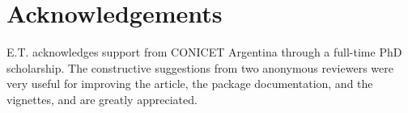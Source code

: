 \section{Acknowledgements}

E.T. acknowledges support from CONICET Argentina through a full-time PhD scholarship. The constructive suggestions from two
anonymous reviewers were very useful for improving the article, the package documentation, and the vignettes, and are greatly
appreciated. 




\address{Ezequiel Toum\\
  IANIGLA-CONICET\\
  Av. Ruiz Leal s/n Parque General San Martin - Mendoza\\
  Argentina\\
  }
 
\address{Mariano H. Masiokas\\
  IANIGLA-CONICET\\
  Av. Ruiz Leal s/n Parque General San Martin - Mendoza\\
  Argentina\\
  }

\address{Ricardo Villalba\\
  IANIGLA-CONICET\\
  Av. Ruiz Leal s/n Parque General San Martin - Mendoza\\
  Argentina\\
  }
    
\address{Pierre Pitte\\
  IANIGLA-CONICET\\
  Av. Ruiz Leal s/n Parque General San Martin - Mendoza\\
  Argentina\\
  }
  
\address{Lucas Ruiz\\
  IANIGLA-CONICET\\
  Av. Ruiz Leal s/n Parque General San Martin - Mendoza\\
  Argentina\\
  }
